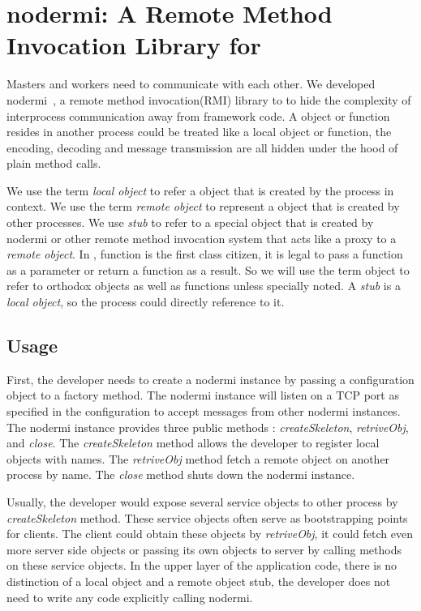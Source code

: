 \chapter{nodermi: A Remote Method Invocation Library for \nodejs{}}

Masters and workers need to communicate with each other.
We developed nodermi~\cite{nodermi}, a remote method invocation(RMI) library to
to hide the complexity of interprocess communication away from
framework code.
A object or function resides in another process
could be treated like a local object or function,
the encoding, decoding and message transmission are all hidden
under the hood of plain method calls.

We use the term \emph{local object}
to refer a object that is created by the process in context.
We use the term \emph{remote object} to represent a object that is
created by other processes.
We use \emph{stub} to refer to a special object that is created
by nodermi or other remote method invocation system that
acts like a proxy to a \emph{remote object}.
In \js{}, function is the first class citizen, it is legal
to pass a function as a parameter or return a function as a result.
So we will use the term object to refer to orthodox objects as well as
functions unless specially noted.
A \emph{stub} is a \emph{local object}, so the process
could directly reference to it.


\section{Usage}
First, the developer needs to create a nodermi instance by passing a configuration
object to a factory method.
The nodermi instance will listen on a TCP port as specified in the configuration
to accept messages from other nodermi instances.
The nodermi instance provides three public methods : \emph{createSkeleton},
\emph{retriveObj}, and \emph{close}.
The \emph{createSkeleton} method allows the developer to register local objects
with names.
The \emph{retriveObj} method fetch a remote object on another process by name.
The \emph{close} method shuts down the nodermi instance.

Usually, the developer would expose several service objects to other process
by \emph{createSkeleton} method.
These service objects often serve as bootstrapping points for clients.
The client could obtain these objects by \emph{retriveObj},
it could fetch even more server side objects or passing its own objects to server
by calling methods on these service objects.
In the upper layer of the application code,
there is no distinction of a local object and a remote object stub,
the developer does not need to write any code explicitly calling nodermi.

